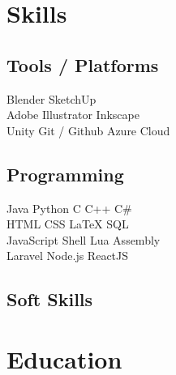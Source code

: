 \documentclass[]{plushcv}
\begin{document}
\begin{minipage}[t]{0.32\textwidth} 


\section{Skills}
\subsection{Tools / Platforms}
{}
Blender \textbullet{} SketchUp \\
\sectionsep
{}
Adobe Illustrator \textbullet{} Inkscape \\
\sectionsep
{}
Unity \textbullet{} Git / Github \textbullet{} Azure Cloud \\
\sectionsep
\sectionsep

\subsection{Programming}
{}
Java \textbullet{} Python \textbullet{} C \textbullet{} C++ \textbullet{} C\# \\
\sectionsep
{}
HTML \textbullet{} CSS \textbullet{} \LaTeX \textbullet{} SQL \\
\sectionsep
{}
JavaScript \textbullet{} Shell \textbullet{} Lua \textbullet{} Assembly \\
\sectionsep
{}
Laravel \textbullet{} Node.js \textbullet{} ReactJS \\
\sectionsep
\sectionsep

\subsection{Soft Skills}
{}
{}
{}
\sectionsep


\section{Education} 


\end{minipage}
\end{document}
